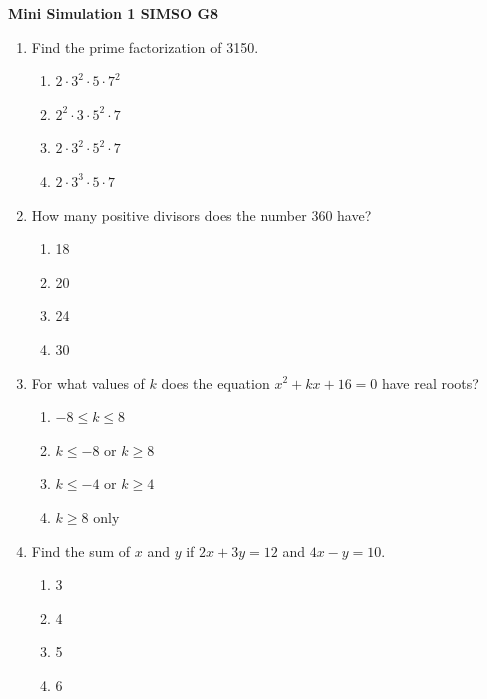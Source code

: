 \documentclass[12pt]{scrartcl}
\begin{document}
\renewcommand*\contentsname{Daftar Isi}
\tableofcontents

\newpage

\begin{center}
    \textbf{\Large Mini Simulation 1 SIMSO G8}
\end{center}

\vspace{0.5cm}

\begin{enumerate}

    \item Find the prime factorization of 3150.
    \begin{enumerate}
        \item $2 \cdot 3^2 \cdot 5 \cdot 7^2$
        \item $2^2 \cdot 3 \cdot 5^2 \cdot 7$
        \item $2 \cdot 3^2 \cdot 5^2 \cdot 7$
        \item $2 \cdot 3^3 \cdot 5 \cdot 7$
    \end{enumerate}

    \item How many positive divisors does the number 360 have?
    \begin{enumerate}
        \item 18
        \item 20
        \item 24
        \item 30
    \end{enumerate}

    \item For what values of $k$ does the equation $x^2 + kx + 16 = 0$ have real roots?
    \begin{enumerate}
        \item $-8 \le k \le 8$
        \item $k \le -8 \text{ or } k \ge 8$
        \item $k \le -4 \text{ or } k \ge 4$
        \item $k \ge 8 \text{ only}$
    \end{enumerate}

    \item Find the sum of $x$ and $y$ if $2x + 3y = 12$ and $4x - y = 10$.
    \begin{enumerate}
        \item 3
        \item 4
        \item 5
        \item 6
    \end{enumerate}


\end{enumerate}
\end{document}

